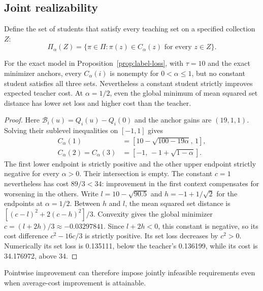 \subsection{Joint realizability}\label{sec:joint-sets}
Define the set of students that satisfy every teaching set on a specified
collection $Z$:
\begin{equation}
 \Pi_\alpha(Z)=\{\pi\in\Pi:\pi(z)\in C_\alpha(z)\text{ for every }z\in Z\}.
\end{equation}
\begin{proposition}\label{prop:joint-sets}
For the exact model in Proposition~\ref{prop:label-loss}, with $\tau=10$ and
the exact minimizer anchors, every $C_\alpha(i)$ is nonempty for
$0<\alpha\leq1$, but no constant student satisfies all three sets.
Nevertheless a constant student strictly improves expected teacher cost.
At $\alpha=1/2$, even the global minimum of mean squared set distance has
lower set loss and higher cost than the teacher.
\end{proposition}
\begin{proof}
Here $\mathcal B_i(u)=Q_i(u)-Q_i(0)$ and the anchor gains are $(19,1,1)$.
Solving their sublevel inequalities on $[-1,1]$ gives
\begin{align}
 C_\alpha(1)&=[10-\sqrt{100-19\alpha},\,1],\\
 C_\alpha(2)=C_\alpha(3)&=[-1,\,-1+\sqrt{1-\alpha}].
\end{align}
The first lower endpoint is strictly positive and the other upper endpoint
strictly negative for every $\alpha>0$. Their intersection is empty.
The constant $c=1$ nevertheless has cost $89/3<34$: improvement in the
first context compensates for worsening in the others.
Write $l=10-\sqrt{90.5}$ and $h=-1+1/\sqrt2$ for the endpoints at
$\alpha=1/2$. Between $h$ and $l$, the mean squared set distance is
$[(c-l)^2+2(c-h)^2]/3$. Convexity gives the global minimizer
$c=(l+2h)/3\approx-0.03297841$. Since $l+2h<0$, this constant is negative,
so its cost difference $c^2-16c/3$ is strictly positive. Its set loss
decreases by $c^2>0$. Numerically its set loss is 0.135111, below the teacher's
0.136199, while its cost is 34.176972, above 34.
\end{proof}

Pointwise improvement can therefore impose jointly infeasible requirements
even when average-cost improvement is attainable.
